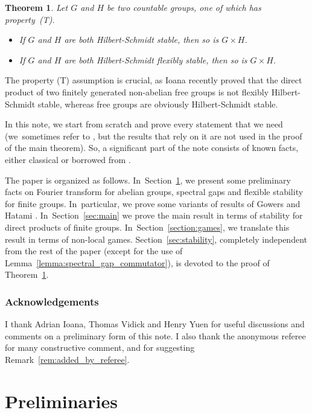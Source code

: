 \documentclass[10pt]{amsart}
\theoremstyle{plain}
\newtheorem{theorem}{Theorem}[section]
\theoremstyle{definition}
\begin{document}
\begin{theorem}\label{thm:stability_direct_product_simple} Let $G$ and $H$ be two countable groups, one of which has property~(T).\enlargethispage{.5\baselineskip}

\begin{itemize}
\item
If $G$ and $H$ are both Hilbert-Schmidt stable, then so is $G\times H$.

\item
If $G$ and $H$ are both Hilbert-Schmidt flexibly stable, then so is $G\times H$.
\end{itemize}
\end{theorem}

The property (T) assumption is crucial, as Ioana recently proved \cite{Ioana2} that the direct product of two finitely generated non-abelian free groups is not flexibly Hilbert-Schmidt stable, whereas free groups are obviously Hilbert-Schmidt stable.

In this note, we start from scratch and prove every statement that we need (we~sometimes refer to \cite{orthonormalisation}, but the results that rely on it are not used in the proof of the main theorem). So, a significant part of the note consists of known facts, either classical or borrowed from \cite{MIPRE}.

The paper is organized as follows. In~Section~\ref{sec:preliminaries}, we present some preliminary facts on Fourier transform for abelian groups, spectral gaps and flexible stability for finite groups. In~particular, we prove some variants of results of Gowers and Hatami \cite{MR3733361}. In~Section~\ref{sec:main} we prove the main result in terms of stability for direct products of finite groups. In~Section~\ref{section:games}, we translate this result in terms of non-local games. Section~\ref{sec:stability}, completely independent from the rest of the paper (except for the use of Lemma~\ref{lemma:spectral_gap_commutator}), is devoted to the proof of Theorem~\ref{thm:stability_direct_product_simple}.

\subsubsection*{Acknowledgements} I thank Adrian Ioana, Thomas Vidick and Henry Yuen for useful discussions and comments on a preliminary form of this note. I also thank the anonymous referee for many constructive comment, and for suggesting Remark~\ref{rem:added_by_referee}.
\section{Preliminaries}\label{sec:preliminaries}
\end{document}
